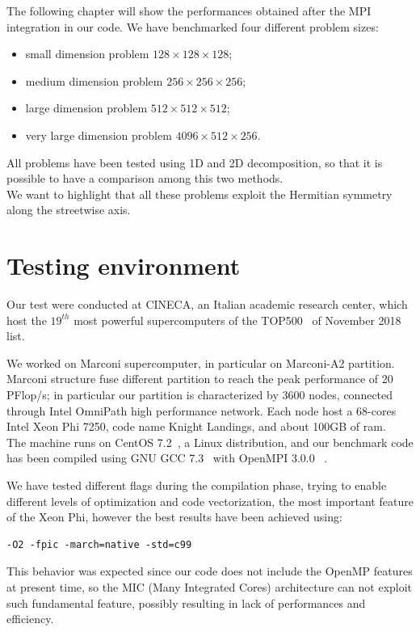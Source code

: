 The following chapter will show the performances obtained after the MPI integration in our code.
We have benchmarked four different problem sizes:
\begin{itemize}
\item small dimension problem $128\times 128 \times 128$;
\item medium dimension problem $256\times 256\times 256$;
\item large dimension problem $512\times 512\times 512$;
\item very large dimension problem $4096\times 512\times 256$.  
\end{itemize}
All problems have been tested using 1D and 2D decomposition, so that it is possible to have a comparison among this two methods.
\\
We want to highlight that all these problems exploit the Hermitian symmetry along the streetwise axis.
\section{Testing environment}
Our test were conducted at CINECA\cite{Cineca}, an Italian academic research center, which host the $19^{th}$ most powerful supercomputers of the TOP500~\cite{top500} of November 2018 list.

We worked on Marconi\cite{marconi:specs} supercomputer, in particular on Marconi-A2 partition.
Marconi structure fuse different partition to reach the peak performance of 20 PFlop/s; in particular our partition is characterized by 3600 nodes, connected through Intel OmniPath\cite{intel:intelmpivsopenmpi} high performance network. Each node host a 68-cores Intel Xeon Phi 7250, code name Knight Landings, and about 100GB of ram. \\
The machine runs on CentOS 7.2~\cite{centos}, a Linux distribution, and our benchmark code has been compiled using GNU GCC 7.3~\cite{gcc} with OpenMPI 3.0.0~\cite{openmpi}\cite{MPI:standard3} . \\
\par
We have tested different flags during the compilation phase, trying to enable different levels of optimization and code vectorization, the most important feature of the Xeon Phi, however the best results have been achieved using:
\begin{lstlisting}
-O2 -fpic -march=native -std=c99
\end{lstlisting}
This behavior was expected since our code does not include the OpenMP\cite{openmp} features at present time, so the MIC\cite{mic} (Many Integrated Cores) architecture can not exploit such fundamental feature, possibly resulting in lack of performances and efficiency.



